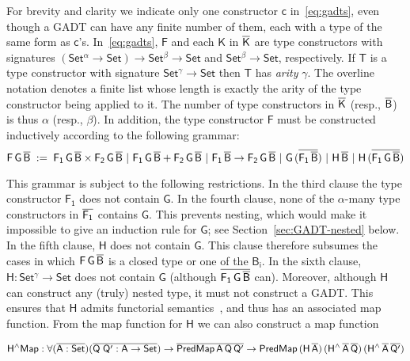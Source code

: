 \documentclass[9pt]{entcs}
\begin{document}
\noindent
For brevity and clarity we indicate only one constructor $\mathsf{c}$
in~\eqref{eq:gadts}, even though a GADT can have any finite number of
them, each with a type of the same form as
$\mathsf{c}$'s. In~\eqref{eq:gadts}, $\mathsf{F}$ and each
$\mathsf{K}$ in $\overline{\mathsf{K}}$ are type constructors with
signatures $\mathsf{(Set^{\alpha} \to Set) \to Set^{\beta} \to Set}$
and $\mathsf{Set^{\beta} \to Set}$, respectively. If $\mathsf{T}$ is a
type constructor with signature $\mathsf{Set^{\gamma} \to Set}$ then
$\mathsf{T}$ has {\em arity} $\mathsf{\gamma}$.  The
overline notation denotes a finite list whose length is exactly the
arity of the type constructor being applied to it. The number of type
constructors in $\overline{\mathsf{K}}$ (resp., $\overline{\mathsf{B}}$) is thus
$\alpha$ (resp., $\beta$). In addition, the type constructor
$\mathsf{F}$ must be constructed inductively according to the
following grammar:
\[\mathsf{F\,G\,\overline{B}\; :=\;
F_1\,G\,\overline{B} \times F_2\,G\,\overline{B} \ \vert\ F_1\,G\,\overline{B} +
F_2\,G\,\overline{B} \ \vert\ F_1\,\overline{B} \to F_2\,G\,\overline{B}
\ \vert\ G\,(\overline{F_1\,\overline{B}}) \ \vert\ H\,\overline{B} \ \vert\ H\,
(\overline{F_1\,G\,\overline{B}}) }\]

\noindent
This grammar is subject to the following restrictions. In the third
clause the type constructor $\mathsf{F_1}$ does not contain
$\mathsf{G}$. In the fourth clause, none of the $\mathsf{\alpha}$-many
type constructors in $\mathsf{\overline{F_1}}$ contains $\mathsf{G}$.  This
prevents nesting, which would make it impossible to give an induction
rule for $\mathsf{G}$; see Section~\ref{sec:GADT-nested} below. In the
fifth clause, $\mathsf{H}$ does not contain $\mathsf{G}$. This clause
therefore subsumes the cases in which $\mathsf{F\,G\,\overline{B}}$ is a
closed type or one of the $\mathsf{B_i}$. In the sixth clause,
$\mathsf{H : Set^\gamma \to Set}$ does not contain $\mathsf{G}$
(although $\overline{\mathsf{F_1\,G\,\overline{B}}}$ can). Moreover, although
$\mathsf{H}$ can construct any (truly) nested type, it must not
construct a GADT. This ensures that $\mathsf{H}$ admits functorial
semantics~\cite{jp20}, and thus has an associated map function. From
the map function for $\mathsf{H}$ we can also construct a map function

\vspace*{-0.05in}

\begin{equation}\label{eq:hliftmap}
\mathsf{H^\wedge Map : \forall (\overline{A : Set}) (\overline{Q\;Q' : A \to Set}) 
\to \overline{PredMap\,A\,Q\,Q'} \to
PredMap\,(H\,\overline{A})\,(H^{\wedge}\,\overline{A}\,\overline{Q})\, 
(H^{\wedge}\,\overline{A}\,\overline{Q'})}
\end{equation}
\end{document}
